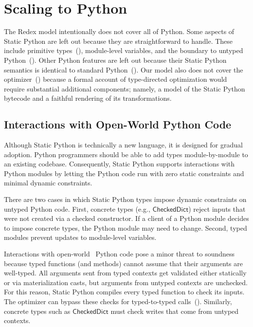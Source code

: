 \documentclass[english,cleveref,crc]{programming}
\newcommand{\SP}{Static Python}
\newcommand{\typefont}[1]{\mathsf{#1}}
\newcommand{\sptrawchkdict}{\typefont{CheckedDict}} %
\begin{document}
\section{Scaling to Python}
\label{s:impl}

The Redex model intentionally does not cover all of Python.
Some aspects of \SP{} are left out because they are straightforward to
handle.
These include primitive types~(), module-level variables,
and the boundary to untyped Python~().
Other Python features are left out because their \SP{} semantics is identical
to standard Python~().
Our model also does not cover the optimizer~() because
a formal account of type-directed optimization would require substantial additional
components; namely, a model of the \SP{} bytecode and a faithful rendering of its
transformations.


\subsection{Interactions with Open-World Python Code}
\label{s:py-boundary}

Although \SP{} is technically a new language, it is designed for gradual adoption.
Python programmers should be able to add types module-by-module to an
existing codebase.
Consequently, \SP{} supports interactions with Python modules
by letting the Python code run with zero static constraints and minimal
dynamic constraints.

There are two cases in which \SP{} types impose dynamic constraints on untyped Python code.
First, concrete types (e.g., $\sptrawchkdict$)
reject inputs that were not created via a checked constructor.
If a client of a Python module decides to impose concrete types, the Python module
may need to change.
Second, typed modules prevent updates to module-level variables.

Interactions with {open-world}~\cite{vss-popl-2017} Python code pose a minor
threat to soundness because
typed functions (and methods) cannot assume that their arguments are
well-typed.
All arguments sent from typed contexts get validated either statically or
via materialization casts, but arguments from untyped contexts are unchecked.
For this reason, \SP{} compiles every typed function to check its inputs.
The optimizer can bypass these checks for typed-to-typed calls~().
Similarly, concrete types such as $\sptrawchkdict$ must check writes that
come from untyped contexts.
\end{document}
